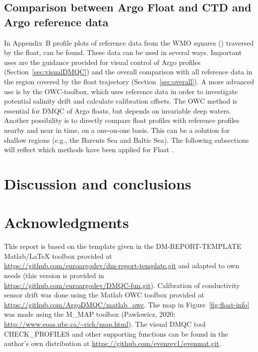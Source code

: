 \documentclass{article}
\begin{document}
\subsection{Comparison between Argo Float and CTD and Argo reference data}\label{sec:salcompare}
%
In Appendix~B profile plots of reference data from the WMO squares
() traversed by the float, can be found. These data can
be used in several ways.
%
Important uses are the guidance provided for visual control of Argo
profiles (Section~\ref{sec:visualDMQC}) and the overall comparison with
all reference data in the region covered by the float trajectory
(Section~\ref{sec:overall}).
%
A more advanced use is by the OWC-toolbox, which uses reference data in
order to investigate potential salinity drift and calculate calibration
offsets. The OWC method is essential for DMQC of Argo floats, but depends
on invariable deep waters.
% 
Another possibility is to directly compare float profiles with reference
profiles nearby and near in time, on a one-on-one basis. This can be a
solution for shallow regions (e.g., the Barents Sea and Baltic Sea).
%
The following subsections will reflect which methods have been applied for
Float \WMOnum.







\FloatBarrier
\newpage
\section{Discussion and conclusions}\label{sec:discussion}






\section*{Acknowledgments}
This report is based on the template given in the DM-REPORT-TEMPLATE
Matlab/LaTeX toolbox provided at\\
\href{url}{https://github.com/euroargodev/dm-report-template.git} and
adapted to own needs (this version is provided in\\
\href{url}{https://github.com/euroargodev/DMQC-fun.git}).  
%
Calibration of conductivity sensor drift was done using the Matlab OWC
toolbox provided at \href{url}{https://github.com/ArgoDMQC/matlab\_owc}.
%
The map in Figure~\ref{fig:float-info} was made using the M\_MAP toolbox
(Pawlowicz, 2020; \url{http://www.eoas.ubc.ca/~rich/map.html}).
%
The visual DMQC tool CHECK\_PROFILES and other supporting functions can be
found in the author's own distribution at
\href{url}{https://github.com/evenrev1/evenmat.git}.
\end{document}
